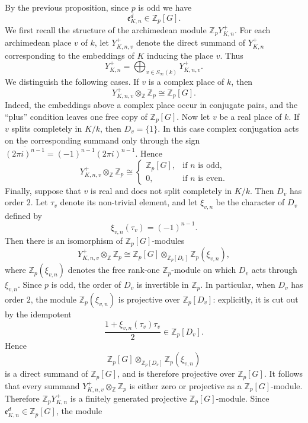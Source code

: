 \documentclass[a4paper,11pt]{article}
\newenvironment{proof}[1][Proof]{\begin{trivlist}
\item[\hskip \labelsep {\bfseries #1}]}{\end{trivlist}}
\begin{document}
\begin{proof}
By the previous proposition, since $p$ is odd we have 
\[
\mathfrak e_{K,n}^d\in\mathbb Z_p[G].
\]
We first recall the structure of the archimedean module
\(\mathbb{Z}_pY_{K,n}^{+}\). For each archimedean place
\(v\) of \(k\), let \(Y_{K,n,v}^{+}\) denote the direct summand of
\(Y_{K,n}^{+}\) corresponding to the embeddings of \(K\) inducing the place
\(v\). Thus
\[
Y_{K,n}^{+}
=
\bigoplus_{v\in S_\infty(k)}Y_{K,n,v}^{+}.
\]
We distinguish the following cases. If \(v\) is a complex place of \(k\), then
\[
Y_{K,n,v}^{+}\otimes_{\mathbb Z}\mathbb Z_p
\cong
\mathbb Z_p[G].
\]
Indeed, the embeddings above a complex place occur in conjugate pairs, and the
``plus'' condition leaves one free copy of \(\mathbb Z_p[G]\).
Now let \(v\) be a real place of \(k\). If \(v\) splits completely in \(K/k\),
then \(D_v=\{1\}\). In this case complex conjugation acts on the corresponding
summand only through the sign
\(
\overline{(2\pi i)^{n-1}}=(-1)^{n-1}(2\pi i)^{n-1}.
\)
Hence
\[
Y_{K,n,v}^{+}\otimes_{\mathbb Z}\mathbb Z_p
\cong
\begin{cases}
\mathbb Z_p[G], & \text{if \(n\) is odd},\\
0, & \text{if \(n\) is even}.
\end{cases}
\]
Finally, suppose that \(v\) is real and does not split completely in \(K/k\).
Then \(D_v\) has order \(2\). Let \(\tau_v\) denote its non-trivial element, and
let \(\xi_{v,n}\) be the character of \(D_v\) defined by
\[
\xi_{v,n}(\tau_v)=(-1)^{n-1}.
\]
Then there is an isomorphism of \(\mathbb Z_p[G]\)-modules
\[
Y_{K,n,v}^{+}\otimes_{\mathbb Z}\mathbb Z_p
\cong
\mathbb Z_p[G]\otimes_{\mathbb Z_p[D_v]}\mathbb Z_p(\xi_{v,n}),
\]
where \(\mathbb Z_p(\xi_{v,n})\) denotes the free rank-one
\(\mathbb Z_p\)-module on which \(D_v\) acts through \(\xi_{v,n}\).
Since \(p\) is odd, the order of \(D_v\) is invertible in \(\mathbb Z_p\). In
particular, when \(D_v\) has order \(2\), the module
\(\mathbb Z_p(\xi_{v,n})\) is projective over \(\mathbb Z_p[D_v]\): explicitly,
it is cut out by the idempotent
\[
\frac{1+\xi_{v,n}(\tau_v)\tau_v}{2}
\in
\mathbb Z_p[D_v].
\]
Hence
\[
\mathbb Z_p[G]\otimes_{\mathbb Z_p[D_v]}\mathbb Z_p(\xi_{v,n})
\]
is a direct summand of \(\mathbb Z_p[G]\), and is therefore projective over
\(\mathbb Z_p[G]\).
It follows that every summand
\(Y_{K,n,v}^{+}\otimes_{\mathbb Z}\mathbb Z_p\) is either zero or projective as
a \(\mathbb Z_p[G]\)-module. Therefore
\(
\mathbb{Z}_pY_{K,n}^{+}
\)
is a finitely generated projective \(\mathbb Z_p[G]\)-module. Since
\(\mathfrak e_{K,n}^d\in\mathbb Z_p[G]\), the module

\end{proof}
\end{document}
